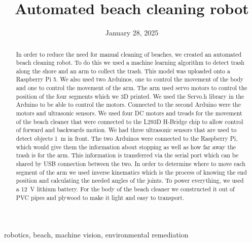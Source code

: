 \documentclass[12pt,conference,onecolumn]{IEEEtran}
\title{Automated beach cleaning robot}
\author{%
\IEEEauthorblockN{Srikar Baru}\IEEEauthorblockA{Science \& Engineering\\Manalapan High School\\Englishtown, NJ\\425sbaru@frhsd.com}\and 
\IEEEauthorblockN{Kevin Tomazic}\IEEEauthorblockA{Science \& Engineering\\Manalapan High School\\Englishtown, NJ\\425ktomazic@frhsd.com}}
\date{January 28, 2025}
\newcommand{\keywords}{robotics, beach, machine vision, environmental remediation}
\begin{document}
\maketitle 

\begin{abstract}
In order to reduce the need for manual cleaning of beaches, we created an automated beach cleaning robot. To do this we used a machine learning algorithm to detect trash along the shore and an arm to collect the trash. This model was uploaded onto a Raspberry Pi 5. We also used two Arduinos, one to control the movement of the body and one to control the movement of the arm. The arm used servo motors to control the position of the four segments which we 3D printed. We used the Servo.h library in the Arduino to be able to control the motors. Connected to the second Arduino were the motors and ultrasonic sensors. We used four DC motors and treads for the movement of the beach cleaner that were connected to the L293D H-Bridge chip to allow control of forward and backwards motion. We had three ultrasonic sensors that are used to detect objects \qty{1}{\meter} in front. The two Arduinos were connected to the Raspberry Pi, which would give them the information about stopping as well as how far away the trash is for the arm. This information is transferred via the serial port which can be shared by USB connection between the two. In order to determine where to move each segment of the arm we used inverse kinematics which is the process of knowing the end position and calculating the needed angles of the joints. To power everything, we used a \qty{12}{\volt} lithium battery. For the body of the beach cleaner we constructed it out of PVC pipes and plywood to make it light and easy to transport.
\end{abstract}

\begin{IEEEkeywords}
\keywords
\end{IEEEkeywords}
\end{document}
